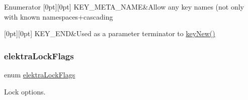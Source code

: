 \begin{DoxyEnumFields}{Enumerator}
[0pt][0pt]{}\mbox{\label{group__key_gga9b703ca49f48b482def322b77d3e6bc8a5205cbd2831bc881da3589a95c08e054}} 
K\+E\+Y\+\_\+\+M\+E\+T\+A\+\_\+\+N\+A\+ME&Allow any key names (not only with known namespaces+cascading \\
\hline

[0pt][0pt]{}\mbox{\label{group__key_gga9b703ca49f48b482def322b77d3e6bc8aa8adb6fcb92dec58fb19410eacfdd403}} 
K\+E\+Y\+\_\+\+E\+ND&Used as a parameter terminator to \hyperlink{group__key_gad23c65b44bf48d773759e1f9a4d43b89}{key\+New()} \\
\hline

\end{DoxyEnumFields}
\mbox{\label{group__key_gafa3306030b1d06b06c3cba24c516f5ec}} 
\subsubsection{\texorpdfstring{elektra\+Lock\+Flags}{elektraLockFlags}}
{\footnotesize\ttfamily enum \hyperlink{group__key_gafa3306030b1d06b06c3cba24c516f5ec}{elektra\+Lock\+Flags}}



Lock options. 

